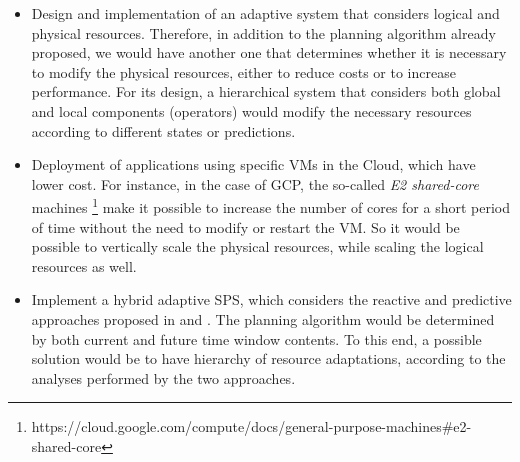 \begin{itemize}
\item Design and implementation of an adaptive system that considers logical and physical resources. Therefore, in addition to the planning algorithm already proposed, we would have another one that determines whether it is necessary to modify the physical resources, either to reduce costs or to increase performance. For its design, a hierarchical system that considers both global and local components (operators) would modify the necessary resources according to different states or predictions.

\item Deployment of applications using specific VMs in the Cloud, which have lower cost. For instance, in the case of GCP, the so-called \textit{E2 shared-core} machines \footnote{https://cloud.google.com/compute/docs/general-purpose-machines\#e2-shared-core} make it possible to increase the number of cores for a short period of time without the need to modify or restart the VM. So it would be possible to vertically scale the physical resources, while scaling the logical resources as well.

\item Implement a hybrid adaptive SPS, which considers the reactive and predictive approaches proposed in \rSPS{} and \pSPS{}. The planning algorithm  would be determined by both current and future time window contents. To this end, a possible solution would be to have hierarchy of resource adaptations, according to the analyses performed by the two approaches.

\end{itemize}